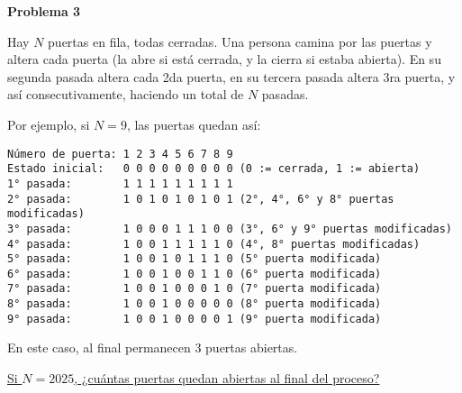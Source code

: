 \begin{center}
\Large \textbf{Problema 3}
\end{center}

Hay $N$ puertas en fila, todas cerradas. Una persona camina por las puertas y altera cada puerta (la abre si está cerrada, y la cierra si estaba abierta). En su segunda pasada altera cada 2da puerta, en su tercera pasada altera 3ra puerta, y así consecutivamente, haciendo un total de $N$ pasadas.

\bigskip

Por ejemplo, si $N = 9$, las puertas quedan así:

\bigskip

\begin{verbatim}
Número de puerta: 1 2 3 4 5 6 7 8 9
Estado inicial:   0 0 0 0 0 0 0 0 0 (0 := cerrada, 1 := abierta)
1° pasada:        1 1 1 1 1 1 1 1 1 
2° pasada:        1 0 1 0 1 0 1 0 1 (2°, 4°, 6° y 8° puertas modificadas)
3° pasada:        1 0 0 0 1 1 1 0 0 (3°, 6° y 9° puertas modificadas)
4° pasada:        1 0 0 1 1 1 1 1 0 (4°, 8° puertas modificadas)
5° pasada:        1 0 0 1 0 1 1 1 0 (5° puerta modificada)
6° pasada:        1 0 0 1 0 0 1 1 0 (6° puerta modificada)
7° pasada:        1 0 0 1 0 0 0 1 0 (7° puerta modificada)
8° pasada:        1 0 0 1 0 0 0 0 0 (8° puerta modificada)
9° pasada:        1 0 0 1 0 0 0 0 1 (9° puerta modificada)
\end{verbatim}

\bigskip

En este caso, al final permanecen 3 puertas abiertas.

\bigskip

\underline{Si $N = 2025$, ¿cuántas puertas quedan abiertas al final del proceso?}

